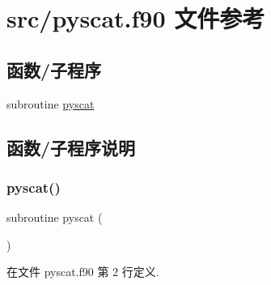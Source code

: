 \hypertarget{pyscat_8f90}{}\section{src/pyscat.f90 文件参考}
\label{pyscat_8f90}
\subsection*{函数/子程序}
\begin{DoxyCompactItemize}
\item 
subroutine \mbox{\hyperlink{pyscat_8f90_a421f30ce6ae114439ec80e4acd031139}{pyscat}}
\end{DoxyCompactItemize}


\subsection{函数/子程序说明}
\mbox{\label{pyscat_8f90_a421f30ce6ae114439ec80e4acd031139}} 
\subsubsection{\texorpdfstring{pyscat()}{pyscat()}}
{\footnotesize\ttfamily subroutine pyscat (\begin{DoxyParamCaption}{ }\end{DoxyParamCaption})}



在文件 pyscat.\+f90 第 2 行定义.

